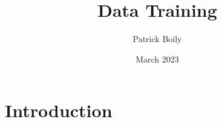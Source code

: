 \documentclass{article}
\title{Data Training}
\author{Patrick Boily}
\date{March 2023}
\begin{document}
\maketitle

\section{Introduction}
\end{document}

